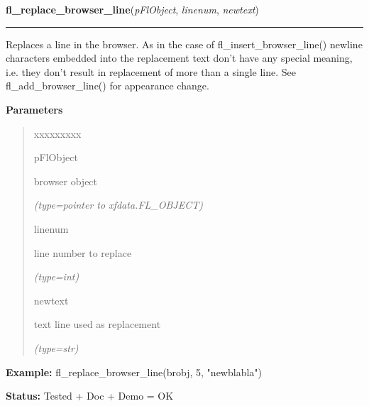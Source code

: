 \hspace{.8\funcindent}\begin{boxedminipage}{\funcwidth}

    \raggedright \textbf{fl\_replace\_browser\_line}(\textit{pFlObject}, \textit{linenum}, \textit{newtext})

    \vspace{-1.5ex}

    \rule{\textwidth}{0.5\fboxrule}
\setlength{\parskip}{2ex}
    Replaces a line in the browser. As in the case of 
    fl\_insert\_browser\_line() newline characters embedded into the 
    replacement text don't have any special meaning, i.e. they don't result
    in replacement of more than a single line. See fl\_add\_browser\_line()
    for appearance change.

\setlength{\parskip}{1ex}
      \textbf{Parameters}
      \vspace{-1ex}

      \begin{quote}
        \begin{Ventry}{xxxxxxxxx}

          \item[pFlObject]

          browser object

            {\it (type=pointer to xfdata.FL\_OBJECT)}

          \item[linenum]

          line number to replace

            {\it (type=int)}

          \item[newtext]

          text line used as replacement

            {\it (type=str)}

        \end{Ventry}

      \end{quote}

\textbf{Example:} fl\_replace\_browser\_line(brobj, 5, "newblabla")



\textbf{Status:} Tested + Doc + Demo = OK



    \end{boxedminipage}

    \label{xformslib:flbrowser:fl_get_browser_line}

